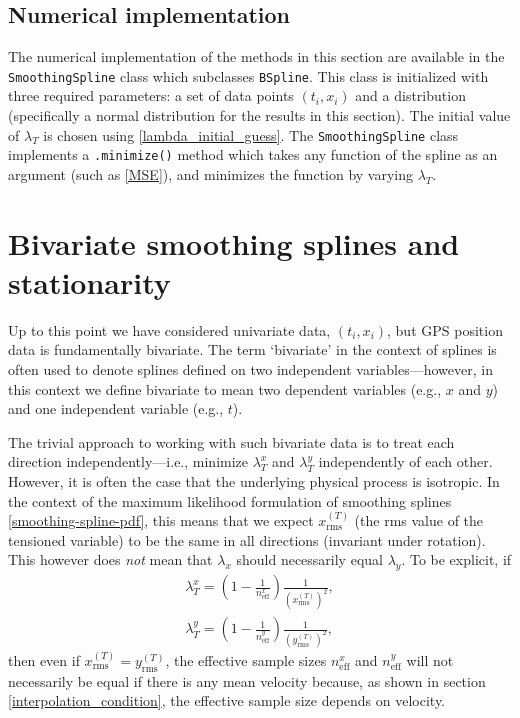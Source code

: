 \documentclass{ametsoc}
\begin{document}

\subsection{Numerical implementation}

The numerical implementation of the methods in this section are available in the \texttt{SmoothingSpline} class which subclasses \texttt{BSpline}. This class is initialized with three required parameters: a set of data points $(t_i,x_i)$ and a distribution (specifically a normal distribution for the results in this section). The initial value of $\lambda_T$ is chosen using \eqref{lambda_initial_guess}. The \texttt{SmoothingSpline} class implements a \texttt{.minimize()} method which takes any function of the spline as an argument (such as \eqref{MSE}), and minimizes the function by varying $\lambda_T$.

\section{Bivariate smoothing splines and stationarity}
\label{sec:bivariate}

Up to this point we have considered univariate data, $(t_i, x_i)$, but GPS position data is fundamentally bivariate. The term `bivariate' in the context of splines is often used to denote splines defined on two independent variables---however, in this context we define bivariate to mean two dependent variables (e.g., $x$ and $y$) and one independent variable (e.g., $t$).

The trivial approach to working with such bivariate data is to treat each direction independently---i.e., minimize $\lambda^x_T$ and $\lambda^y_T$ independently of each other. However, it is often the case that the underlying physical process is isotropic. In the context of the maximum likelihood formulation of smoothing splines \eqref{smoothing-spline-pdf}, this means that we expect $x^{(T)}_{\textrm{rms}}$ (the rms value of the tensioned variable) to be the same in all directions (invariant under rotation). This however does \emph{not} mean that $\lambda_x$ should necessarily equal $\lambda_y$. To be explicit, if 
\begin{equation}
\label{lambda_x}
\begin{split}
\lambda^x_T = \left( 1 - \frac{1}{n^x_{\textrm{eff}}} \right) \frac{1}{ \left(x^{(T)}_{\textrm{rms}}\right)^2}, \\
\lambda^y_T = \left( 1 - \frac{1}{n^y_{\textrm{eff}}} \right) \frac{1}{ \left(y^{(T)}_{\textrm{rms}}\right)^2},
\end{split}
\end{equation}
then even if $x^{(T)}_{\textrm{rms}} = y^{(T)}_{\textrm{rms}}$, the effective sample sizes $n^x_{\textrm{eff}}$ and $n^y_{\textrm{eff}}$ will not necessarily be equal if there is any mean velocity because, as shown in section \ref{interpolation_condition}, the effective sample size depends on velocity.
\end{document}
